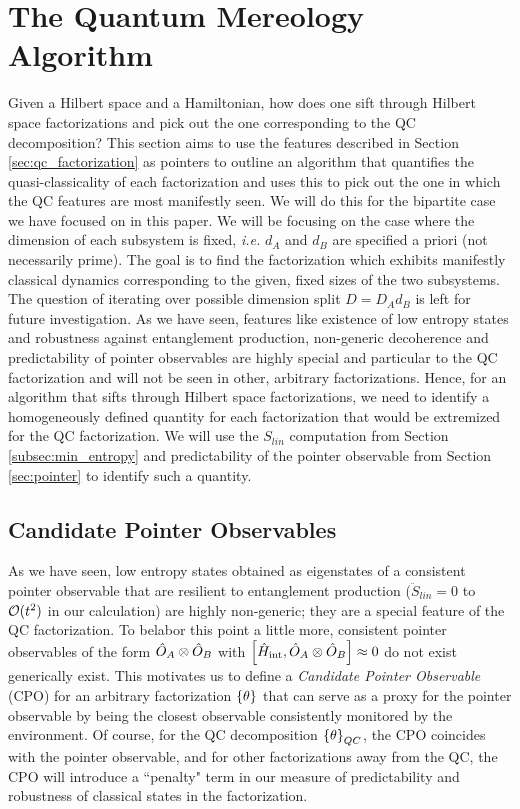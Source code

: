 \documentclass[aps,pra,onecolumn,nofootinbib,11pt,tightenlines]{revtex4-1}
\begin{document}
\section{The Quantum Mereology Algorithm}
\label{sec:algorithm}

Given a Hilbert space and a Hamiltonian, how does one sift through Hilbert space factorizations and pick out the one corresponding to the QC decomposition? This section aims to use the features described in Section \ref{sec:qc_factorization} as pointers to outline an algorithm that quantifies the quasi-classicality of each factorization and uses this to pick out the one in which the QC features are most manifestly seen. We will do this for the bipartite case we have focused on in this paper. {We will be focusing on the case where the dimension of each subsystem is fixed, \textit{i.e.} $d_A$ and $d_B$ are specified a priori (not necessarily prime). The goal is to find the factorization which exhibits manifestly classical dynamics corresponding to the given, fixed sizes of the two subsystems. The question of iterating over possible dimension split $D = D_{A}d_{B}$ is left for future investigation.} As we have seen, features like existence of low entropy states and robustness against entanglement production, non-generic decoherence and predictability of pointer observables are highly special and particular to the QC factorization and will not be seen in other, arbitrary factorizations. Hence, for an algorithm that sifts through Hilbert space factorizations, we need to identify a homogeneously defined quantity for each factorization that would be extremized for the QC factorization. We will use the $S_{lin}$ computation from Section \ref{subsec:min_entropy} and predictability of the pointer observable from Section \ref{sec:pointer} to identify such a quantity. 

\subsection{Candidate Pointer Observables}

As we have seen, low entropy states obtained as eigenstates of a consistent pointer observable that are resilient to entanglement production ($\ddot{S}_{lin} = 0$ to $\mathcal{O}(t^2) $ in our calculation) are highly non-generic; they are a special feature of the QC factorization. To belabor this point a little more, consistent pointer observables of the form $\hat{O}_{A} \otimes \hat{O}_{B}$ with $\left[ \hat{H}_{\rm{int}}, \hat{O}_{A} \otimes \hat{O}_{B} \right] \approx 0$ do not exist generically exist. This motivates us to define a \emph{Candidate Pointer Observable} (CPO) for an arbitrary factorization ${\{\theta\}}$ that can serve as a proxy for the pointer observable by being the closest observable consistently monitored by the environment. Of course, for the QC decomposition ${\{\theta\}}_{QC}$, the CPO coincides with the pointer observable, and for other factorizations away from the QC, the CPO will introduce a ``penalty" term in our measure of predictability and robustness of classical states in the factorization.
\end{document}
